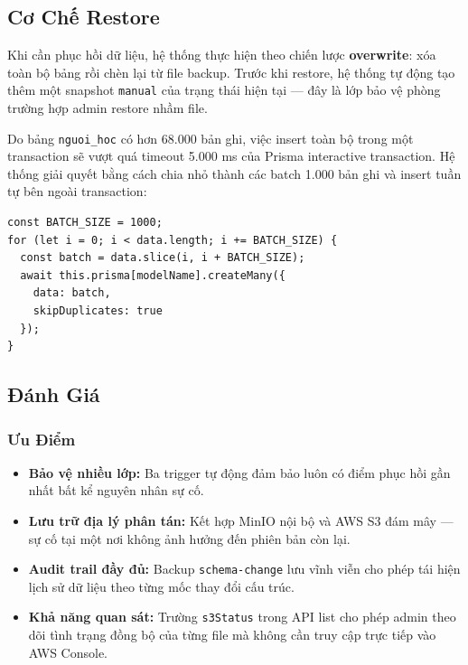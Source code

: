 \subsection{Cơ Chế Restore}

Khi cần phục hồi dữ liệu, hệ thống thực hiện theo chiến lược
\textbf{overwrite}: xóa toàn bộ bảng rồi chèn lại từ file backup.
Trước khi restore, hệ thống tự động tạo thêm một snapshot \texttt{manual}
của trạng thái hiện tại — đây là lớp bảo vệ phòng trường hợp admin restore
nhầm file.

Do bảng \texttt{nguoi\_hoc} có hơn 68.000 bản ghi, việc insert toàn bộ trong
một transaction sẽ vượt quá timeout 5.000 ms của Prisma interactive
transaction. Hệ thống giải quyết bằng cách chia nhỏ thành các batch 1.000
bản ghi và insert tuần tự bên ngoài transaction:

\begin{lstlisting}[caption={Batch INSERT khi restore}]
const BATCH_SIZE = 1000;
for (let i = 0; i < data.length; i += BATCH_SIZE) {
  const batch = data.slice(i, i + BATCH_SIZE);
  await this.prisma[modelName].createMany({
    data: batch,
    skipDuplicates: true
  });
}
\end{lstlisting}

\subsection{Đánh Giá}

\subsubsection{Ưu Điểm}

\begin{itemize}
    \item \textbf{Bảo vệ nhiều lớp:} Ba trigger tự động đảm bảo luôn có điểm
    phục hồi gần nhất bất kể nguyên nhân sự cố.
    \item \textbf{Lưu trữ địa lý phân tán:} Kết hợp MinIO nội bộ và AWS S3
    đám mây — sự cố tại một nơi không ảnh hưởng đến phiên bản còn lại.
    \item \textbf{Audit trail đầy đủ:} Backup \texttt{schema-change} lưu vĩnh
    viễn cho phép tái hiện lịch sử dữ liệu theo từng mốc thay đổi cấu trúc.
    \item \textbf{Khả năng quan sát:} Trường \texttt{s3Status} trong API list
    cho phép admin theo dõi tình trạng đồng bộ của từng file mà không cần
    truy cập trực tiếp vào AWS Console.
\end{itemize}

